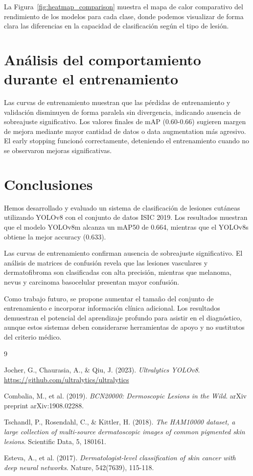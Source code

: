 \documentclass{llncs}
\begin{document}
La Figura~\ref{fig:heatmap_comparison} muestra el mapa de calor comparativo del rendimiento de los modelos para cada clase, donde podemos visualizar de forma clara las diferencias en la capacidad de clasificación según el tipo de lesión.

\section{Análisis del comportamiento durante el entrenamiento}

Las curvas de entrenamiento muestran que las pérdidas de entrenamiento y validación disminuyen de forma paralela sin divergencia, indicando ausencia de sobreajuste significativo. Los valores finales de mAP (0.60-0.66) sugieren margen de mejora mediante mayor cantidad de datos o data augmentation más agresivo. El early stopping funcionó correctamente, deteniendo el entrenamiento cuando no se observaron mejoras significativas.

\section{Conclusiones}

Hemos desarrollado y evaluado un sistema de clasificación de lesiones cutáneas utilizando YOLOv8 con el conjunto de datos ISIC 2019. Los resultados muestran que el modelo YOLOv8m alcanza un mAP50 de 0.664, mientras que el YOLOv8s obtiene la mejor accuracy (0.633).

Las curvas de entrenamiento confirman ausencia de sobreajuste significativo. El análisis de matrices de confusión revela que las lesiones vasculares y dermatofibroma son clasificadas con alta precisión, mientras que melanoma, nevus y carcinoma basocelular presentan mayor confusión.

Como trabajo futuro, se propone aumentar el tamaño del conjunto de entrenamiento e incorporar información clínica adicional. Los resultados demuestran el potencial del aprendizaje profundo para asistir en el diagnóstico, aunque estos sistemas deben considerarse herramientas de apoyo y no sustitutos del criterio médico.

\begin{thebibliography}{9}

Jocher, G., Chaurasia, A., \& Qiu, J. (2023).
\textit{Ultralytics YOLOv8}.
\url{https://github.com/ultralytics/ultralytics}

Combalia, M., et al. (2019).
\textit{BCN20000: Dermoscopic Lesions in the Wild}.
arXiv preprint arXiv:1908.02288.

Tschandl, P., Rosendahl, C., \& Kittler, H. (2018).
\textit{The HAM10000 dataset, a large collection of multi-source dermatoscopic images of common pigmented skin lesions}.
Scientific Data, 5, 180161.

Esteva, A., et al. (2017).
\textit{Dermatologist-level classification of skin cancer with deep neural networks}.
Nature, 542(7639), 115-118.

\end{thebibliography}
\end{document}
